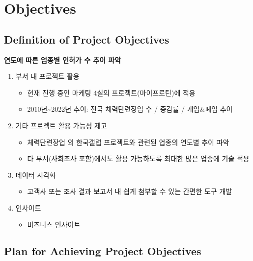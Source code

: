 \documentclass[
]{book}
\providecommand{\tightlist}{%
  \setlength{\itemsep}{0pt}\setlength{\parskip}{0pt}}
\begin{document}
\hypertarget{objectives}{%
\chapter{Objectives}\label{objectives}}

\hypertarget{definition-of-project-objectives}{%
\section{Definition of Project Objectives}\label{definition-of-project-objectives}}

\textbf{연도에 따른 업종별 인허가 수 추이 파악}

\begin{enumerate}
\def\labelenumi{\arabic{enumi}.}
\item
  부서 내 프로젝트 활용

  \begin{itemize}
  \item
    현재 진행 중인 마케팅 4실의 프로젝트(마이프로틴)에 적용
  \item
    2010년\textasciitilde2022년 추이: 전국 체력단련장업 수 / 증감률 / 개업\&폐업 추이
  \end{itemize}
\item
  기타 프로젝트 활용 가능성 제고

  \begin{itemize}
  \item
    체력단련장업 외 한국갤럽 프로젝트와 관련된 업종의 연도별 추이 파악
  \item
    타 부서(사회조사 포함)에서도 활용 가능하도록 최대한 많은 업종에 기술 적용
  \end{itemize}
\item
  데이터 시각화

  \begin{itemize}
  \tightlist
  \item
    고객사 또는 조사 결과 보고서 내 쉽게 첨부할 수 있는 간편한 도구 개발
  \end{itemize}
\item
  인사이트

  \begin{itemize}
  \tightlist
  \item
    비즈니스 인사이트
  \end{itemize}
\end{enumerate}

\hypertarget{plan-for-achieving-project-objectives}{%
\section{Plan for Achieving Project Objectives}\label{plan-for-achieving-project-objectives}}
\end{document}
